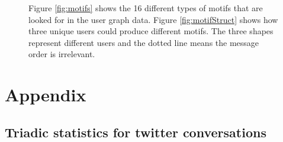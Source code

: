\begin{figure}[!h]
    \centering
    
    \caption{ Figure \ref{fig:motifs} shows the 16 different types of motifs that are looked for in the user graph data. Figure \ref{fig:motifStruct} shows how three unique users could produce different motifs. The three shapes represent different users and the dotted line means the message order is irrelevant.}
    \label{Fig:motifs}
\end{figure}




\section{Appendix}

\subsection{Triadic statistics for twitter conversations}

